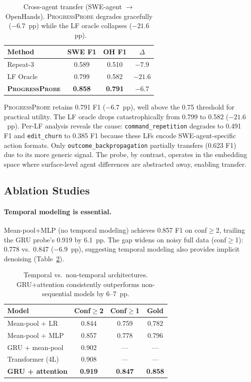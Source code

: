 \documentclass[11pt,a4paper]{article}
\newcommand{\ours}{\textsc{ProgressProbe}}
\begin{document}
\begin{table}[t]
\centering
\small
\begin{tabular}{lccc}
\toprule
\textbf{Method} & \textbf{SWE F1} & \textbf{OH F1} & \textbf{$\Delta$} \\
\midrule
Repeat-3 & 0.589 & 0.510 & $-7.9$ \\
LF Oracle & 0.799 & 0.582 & $-21.6$ \\
\textbf{\ours{}} & \textbf{0.858} & \textbf{0.791} & $\mathbf{-6.7}$ \\
\bottomrule
\end{tabular}
\caption{Cross-agent transfer (SWE-agent $\to$ OpenHands). \ours{} degrades gracefully ($-6.7$~pp) while the LF oracle collapses ($-21.6$~pp).}
\label{tab:cross-agent}
\end{table}

\ours{} retains 0.791 F1 ($-6.7$~pp), well above the 0.75 threshold for practical utility. The LF oracle drops catastrophically from 0.799 to 0.582 ($-21.6$~pp). Per-LF analysis reveals the cause: \texttt{command\_repetition} degrades to 0.491 F1 and \texttt{edit\_churn} to 0.385 F1 because these LFs encode SWE-agent-specific action formats. Only \texttt{outcome\_backpropagation} partially transfers (0.623 F1) due to its more generic signal. The probe, by contrast, operates in the embedding space where surface-level agent differences are abstracted away, enabling transfer.

\subsection{Ablation Studies}
\label{sec:ablations}

\paragraph{Temporal modeling is essential.}
Mean-pool+MLP (no temporal modeling) achieves 0.857 F1 on conf$\geq$2, trailing the GRU probe's 0.919 by 6.1~pp. The gap widens on noisy full data (conf$\geq$1): 0.778 vs.\ 0.847 ($-6.9$~pp), suggesting temporal modeling also provides implicit denoising (Table~\ref{tab:temporal-vs-static}).

\begin{table}[t]
\centering
\small
\begin{tabular}{lccc}
\toprule
\textbf{Model} & \textbf{Conf$\geq$2} & \textbf{Conf$\geq$1} & \textbf{Gold} \\
\midrule
Mean-pool + LR & 0.844 & 0.759 & 0.782 \\
Mean-pool + MLP & 0.857 & 0.778 & 0.796 \\
GRU + mean-pool & 0.902 & --- & --- \\
Transformer (4L) & 0.908 & --- & --- \\
\textbf{GRU + attention} & \textbf{0.919} & \textbf{0.847} & \textbf{0.858} \\
\bottomrule
\end{tabular}
\caption{Temporal vs.\ non-temporal architectures. GRU+attention consistently outperforms non-sequential models by 6--7~pp.}
\label{tab:temporal-vs-static}
\end{table}
\end{document}
